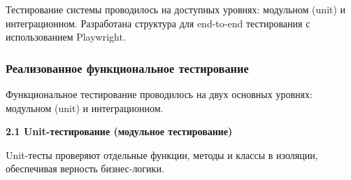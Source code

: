 
Тестирование системы проводилось на доступных уровнях: модульном (unit) и интеграционном. Разработана структура для end-to-end тестирования с использованием Playwright.

\subsubsection*{Реализованное функциональное тестирование}

Функциональное тестирование проводилось на двух основных уровнях: модульном (unit) и интеграционном.

\textbf{2.1 Unit-тестирование (модульное тестирование)}

Unit-тесты проверяют отдельные функции, методы и классы в изоляции, обеспечивая верность бизнес-логики.

